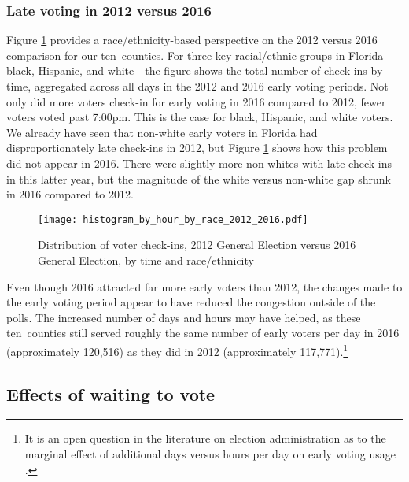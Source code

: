 \documentclass[12pt,titlepage]{article}
\newcommand{\numcounties}{ten}
\begin{document}
\subsubsection*{Late voting in 2012 versus 2016}

Figure \ref{fig:race2012and2016} provides a race/ethnicity-based
perspective on the 2012 versus 2016 comparison for our \numcounties\
counties.  For three key racial/ethnic groups in Florida---black,
Hispanic, and white---the figure shows the total number of check-ins
by time, aggregated across all days in the 2012 and 2016 early voting
periods.  Not only did more voters check-in for early voting in 2016
compared to 2012, fewer voters voted past 7:00pm. This is the case for
black, Hispanic, and white voters. We already have seen that non-white
early voters in Florida had disproportionately late check-ins in 2012,
but Figure \ref{fig:race2012and2016} shows how this problem did not
appear in 2016. There were slightly more non-whites with late
check-ins in this latter year, but the magnitude of the white versus
non-white gap shrunk in 2016 compared to 2012.

\begin{figure}[!ht]
  \caption{Distribution of voter check-ins, 2012 General Election
    versus 2016 General Election, by time and race/ethnicity}
  \label{fig:race2012and2016}
  \centering
  \centering\texttt{[image: histogram\_by\_hour\_by\_race\_2012\_2016.pdf]}
\end{figure}

Even though 2016 attracted far more early voters than 2012, the
changes made to the early voting period appear to have reduced the
congestion outside of the polls. The increased number of days and
hours may have helped, as these \numcounties\ counties still served
roughly the same number of early voters per day in 2016 (approximately
120,516) as they did in 2012 (approximately 117,771).\footnote{It is
  an open question in the literature on election administration as to
  the marginal effect of additional days versus hours per day on early
  voting usage \citep[e.g.,][]{walkeretal:ncearly}.}



\subsection*{Effects of waiting to vote}
\end{document}

